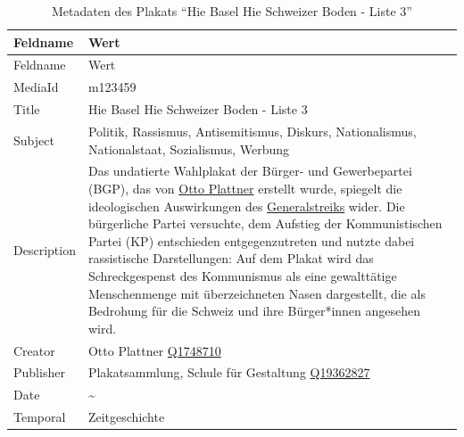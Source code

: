 \documentclass[
  letterpaper,
  DIV=11,
  numbers=noendperiod]{scrartcl}
\begin{document}
\begin{longtable}[]{@{}
  >{\raggedright\arraybackslash}p{}
  >{\raggedright\arraybackslash}p{}@{}}
\caption{Metadaten des Plakats ``Hie Basel Hie Schweizer Boden - Liste
3''}\label{tbl-metadaten-hie-basel-hie-schweizer-boden-liste-3}\tabularnewline
\toprule\noalign{}
\begin{minipage}[b]{\linewidth}\raggedright
Feldname
\end{minipage} & \begin{minipage}[b]{\linewidth}\raggedright
Wert
\end{minipage} \\
\midrule\noalign{}
\endfirsthead
\toprule\noalign{}
\begin{minipage}[b]{\linewidth}\raggedright
Feldname
\end{minipage} & \begin{minipage}[b]{\linewidth}\raggedright
Wert
\end{minipage} \\
\midrule\noalign{}
\endhead
\bottomrule\noalign{}
\endlastfoot
MediaId & m123459 \\
Title & Hie Basel Hie Schweizer Boden - Liste 3 \\
Subject & Politik, Rassismus, Antisemitismus, Diskurs, Nationalismus,
Nationalstaat, Sozialismus, Werbung \\
Description & Das undatierte Wahlplakat der Bürger- und Gewerbepartei
(BGP), das von
\href{https://hls-dhs-dss.ch/de/articles/048316/2010-09-28/}{Otto
Plattner} erstellt wurde, spiegelt die ideologischen Auswirkungen des
\href{https://www.baslerstadtbuch.ch/chronik/1919/08/01/am-donnerstag-31-juli-brach-in-basel-ein-generalstreik-aus.html}{Generalstreiks}
wider. Die bürgerliche Partei versuchte, dem Aufstieg der
Kommunistischen Partei (KP) entschieden entgegenzutreten und nutzte
dabei rassistische Darstellungen: Auf dem Plakat wird das
Schreckgespenst des Kommunismus als eine gewalttätige Menschenmenge mit
überzeichneten Nasen dargestellt, die als Bedrohung für die Schweiz und
ihre Bürger*innen angesehen wird. \\
Creator & Otto Plattner
\href{https://www.wikidata.org/wiki/Q1748710}{Q1748710} \\
Publisher & Plakatsammlung, Schule für Gestaltung
\href{https://www.wikidata.org/wiki/Q19362827}{Q19362827} \\
Date & 1925\textasciitilde{} \\
Temporal & Zeitgeschichte \\

\end{longtable}
\end{document}
